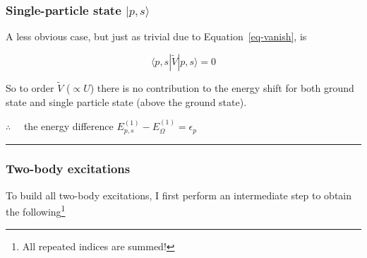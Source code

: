 \documentclass[
  letterpaper,
  DIV=11,
  numbers=noendperiod]{scrartcl}
\begin{document}
\subsubsection{\texorpdfstring{Single-particle state
\(|p,s\rangle\)}{Single-particle state \textbar p,s\textbackslash rangle}}\label{single-particle-state-psrangle-1}

A less obvious case, but just as trivial due to
Equation~\ref{eq-vanish}, is

\[
\langle p,s|\tilde V|p,s\rangle=0
\]

So to order \(\tilde V\) (\(\propto U\)) there is no contribution to the
energy shift for both ground state and single particle state (above the
ground state).

\begin{tcolorbox}[enhanced jigsaw, arc=.35mm, bottomrule=.15mm, bottomtitle=1mm, breakable, colback=white, colbacktitle=quarto-callout-note-color!10!white, colframe=quarto-callout-note-color-frame, coltitle=black, left=2mm, leftrule=.75mm, opacityback=0, opacitybacktitle=0.6, rightrule=.15mm, title=\textcolor{quarto-callout-note-color}{\faInfo}\hspace{0.5em}{Energy difference at \(\mathcal{O}(V)\)}, titlerule=0mm, toprule=.15mm, toptitle=1mm]

\(\therefore\quad\) the energy difference
\(E^{(1)}_{p,s}-E^{(1)}_\Omega=\epsilon_p\)

\end{tcolorbox}

\begin{center}\rule{0.5\linewidth}{0.5pt}\end{center}

\subsubsection{Two-body excitations}\label{two-body-excitations}

To build all two-body excitations, I first perform an intermediate step
to obtain the following\footnote{All repeated indices are summed!}
\end{document}
